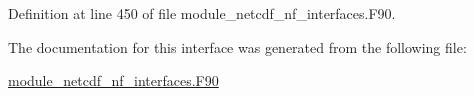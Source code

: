 Definition at line 450 of file module\+\_\+netcdf\+\_\+nf\+\_\+interfaces.\+F90.



The documentation for this interface was generated from the following file\+:\begin{DoxyCompactItemize}
\item 
\hyperlink{module__netcdf__nf__interfaces_8F90}{module\+\_\+netcdf\+\_\+nf\+\_\+interfaces.\+F90}\end{DoxyCompactItemize}
